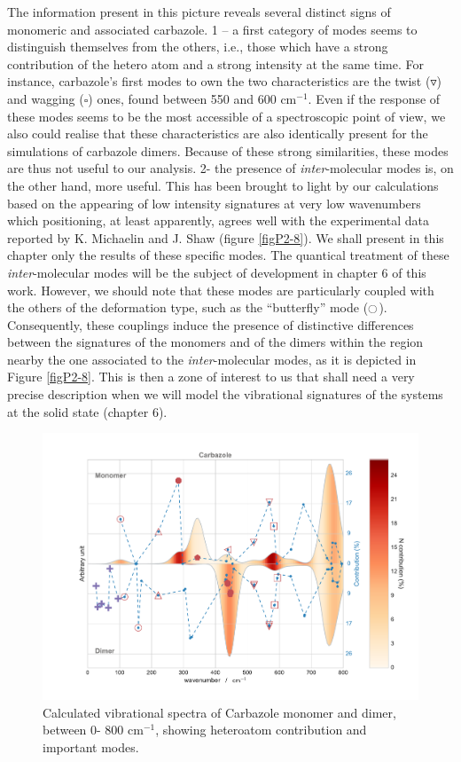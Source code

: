 	The information present in this picture reveals several distinct signs of monomeric and associated carbazole. 1 – a first category of modes seems to distinguish themselves from the others, i.e., those which have a strong contribution of the hetero atom and a strong intensity at the same time. For instance, carbazole’s first modes to own the two characteristics are the twist ($\triangledown$) and wagging ($\square$) ones, found between 550 and 600 cm$^{-1}$. Even if the response of these modes seems to be the most accessible of a spectroscopic point of view, we also could realise that these characteristics are also identically present for the simulations of carbazole dimers. Because of these strong similarities, these modes are thus not useful to our analysis. 2- the presence of \textit{inter}-molecular modes is, on the other hand, more useful. This has been brought to light by our calculations based on the appearing of low intensity signatures at very low wavenumbers which positioning, at least apparently, agrees well with the experimental data reported by K. Michaelin and J. Shaw (figure \ref{figP2-8}). We shall present in this chapter only the results of these specific modes. The quantical treatment of these \textit{inter}-molecular modes will be the subject of development in chapter 6 of this work. However, we should note that these modes are particularly coupled with the others of the deformation type, such as the “butterfly” mode ($\ocircle$). 
	 Consequently, these couplings induce the presence of distinctive differences between the signatures of the monomers and of the dimers within the region nearby the one associated to the \textit{inter}-molecular modes, as it is depicted in Figure \ref{figP2-8}. This is then a zone of interest to us that shall need a very precise description when we will model the vibrational signatures of the systems at the solid state (chapter 6).
	 
	 
	 	\begin{figure}[H]
	 		\begin{center}
	 			\includegraphics[scale=0.5]{image/P2-7}
	 		\end{center}
	 		\caption{Calculated vibrational spectra of Carbazole monomer and dimer, between 0- 800 cm$^{-1}$, showing heteroatom contribution and important modes.}  \label{figP2-7}
	 	\end{figure}
	 	

